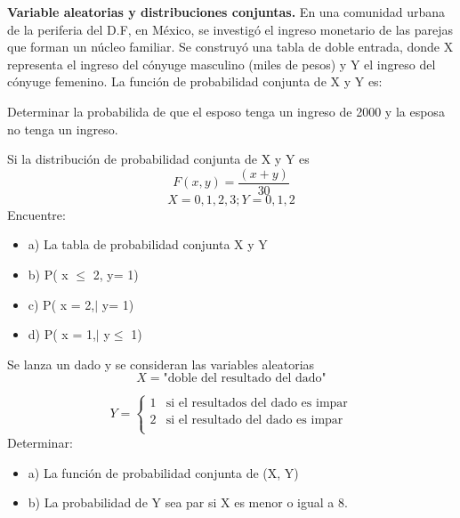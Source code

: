 \documentclass{oxmathproblems}
\begin{document}
\begin{questions}

\miquestion \textbf {Variable aleatorias y distribuciones conjuntas.} En una comunidad urbana de la periferia del D.F, en México, se investigó el ingreso monetario de las parejas que forman un núcleo familiar. Se construyó una tabla de doble entrada, donde X representa el ingreso del cónyuge masculino (miles de pesos) y Y el ingreso del cónyuge femenino. 
La función de probabilidad conjunta de X y Y es: 


Determinar la probabilida de que el esposo tenga un ingreso de 2000 y la esposa no tenga un ingreso. 

\miquestion Si la distribución de probabilidad conjunta de X y Y es
$$ F(x,y) =  \frac{(x+y)}{30}$$  $$X = 0,1,2,3 ;  Y= 0,1,2 $$ Encuentre: 
\begin{itemize}
\item  a) La tabla de probabilidad conjunta X y Y 
\item  b) P( x $\leq$ 2, y= 1)
\item  c) P( x = 2,$\mid$ y= 1)
\item  d) P( x = 1,$\mid$ y$\leq$ 1)
\end{itemize}

\miquestion Se lanza un dado y se consideran las variables aleatorias
 $$ X = \text{"doble del resultado del dado"} $$
 
 \[   
Y = 
     \begin{cases}
       1 &  \text{si el resultados del dado es impar}\\
       2 & \text{si el resultado del dado es impar} \\
     \end{cases}
\]
$$$$
Determinar: 
\begin{itemize}
\item  a) La función de probabilidad conjunta de (X, Y)
\item  b) La probabilidad de Y sea par si X es menor o igual a 8. 
\end{itemize}


\end{questions}
\end{document}
